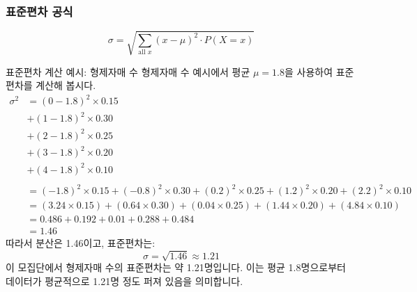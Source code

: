 \documentclass[11pt,a4paper]{article}
\theoremstyle{definition}
\begin{document}
\subsubsection*{표준편차 공식}
\[ \sigma = \sqrt{\sum_{\text{all } x} (x - \mu)^2 \cdot P(X=x)} \]

\begin{examplebox}{표준편차 계산 예시: 형제자매 수}
형제자매 수 예시에서 평균 \(\mu = 1.8\)을 사용하여 표준편차를 계산해 봅시다.
\begin{align*} \sigma^2 &= (0 - 1.8)^2 \times 0.15 \\ &+ (1 - 1.8)^2 \times 0.30 \\ &+ (2 - 1.8)^2 \times 0.25 \\ &+ (3 - 1.8)^2 \times 0.20 \\ &+ (4 - 1.8)^2 \times 0.10 \\ \\ &= (-1.8)^2 \times 0.15 + (-0.8)^2 \times 0.30 + (0.2)^2 \times 0.25 + (1.2)^2 \times 0.20 + (2.2)^2 \times 0.10 \\ &= (3.24 \times 0.15) + (0.64 \times 0.30) + (0.04 \times 0.25) + (1.44 \times 0.20) + (4.84 \times 0.10) \\ &= 0.486 + 0.192 + 0.01 + 0.288 + 0.484 \\ &= 1.46 \end{align*}
따라서 분산은 1.46이고, 표준편차는:
\[ \sigma = \sqrt{1.46} \approx 1.21 \]
이 모집단에서 형제자매 수의 표준편차는 약 1.21명입니다. 이는 평균 1.8명으로부터 데이터가 평균적으로 1.21명 정도 퍼져 있음을 의미합니다.
\end{examplebox}
\end{document}
